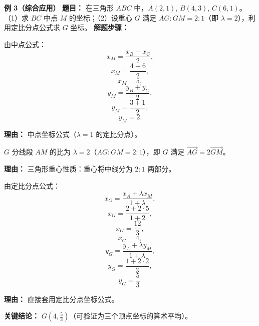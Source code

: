 \begin{examplebox}
	\medskip
	\textbf{\textcolor{CExample}{例 3（综合应用）}}
	\textbf{\textcolor{CExample}{题目：}}
	在三角形 $ABC$ 中，$A(2,1)$, $B(4,3)$, $C(6,1)$。（1）求 $BC$ 中点 $M$ 的坐标；（2）设重心 $G$ 满足 $AG:GM=2:1$（即 $\lambda=2$），利用定比分点公式求 $G$ 坐标。
	\textbf{\textcolor{CExample}{解题步骤：}}
	\begin{description}[style=nextline, leftmargin=2.8em, labelsep=0.5em, itemsep=0.45em]
		\item[\textbf{第一步（求中点M）：}]
			由中点公式：
			\[
				x_M = \frac{x_B+x_C}{2},
			\]
			\[
				x_M = \frac{4+6}{2},
			\]
			\[
				x_M = 5,
			\]
			\[
				y_M = \frac{y_B+y_C}{2},
			\]
			\[
				y_M = \frac{3+1}{2},
			\]
			\[
				y_M = 2.
			\]
			\par\textbf{理由：} 中点坐标公式（$\lambda=1$ 的定比分点）。
		\item[\textbf{第二步（分析分比）：}]
			$G$ 分线段 $AM$ 的比为 $\lambda=2$（$AG:GM=2:1$），即 $G$ 满足 $\overrightarrow{AG}=2\overrightarrow{GM}$。
			\par\textbf{理由：} 三角形重心性质：重心将中线分为 $2:1$ 两部分。
		\item[\textbf{第三步（代入公式求G）：}]
			由定比分点公式：
			\[
				x_G = \frac{x_A+\lambda x_M}{1+\lambda},
			\]
			\[
				x_G = \frac{2+2\cdot5}{1+2},
			\]
			\[
				x_G = \frac{12}{3},
			\]
			\[
				x_G = 4,
			\]
			\[
				y_G = \frac{y_A+\lambda y_M}{1+\lambda},
			\]
			\[
				y_G = \frac{1+2\cdot2}{3},
			\]
			\[
				y_G = \frac{5}{3}.
			\]
			\par\textbf{理由：} 直接套用定比分点坐标公式。
	\end{description}
	\textbf{\textcolor{CExample}{关键结论：}}
	\textbf{$G(4, \frac{5}{3})$}（可验证为三个顶点坐标的算术平均）。
\end{examplebox}
